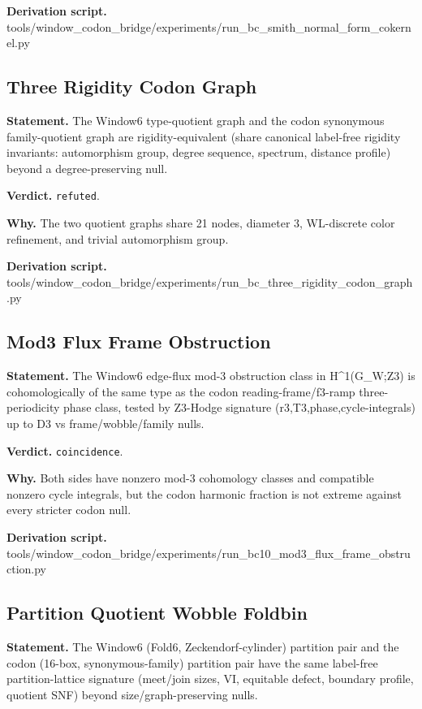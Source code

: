 \textbf{Derivation script.} tools/window\_codon\_bridge/experiments/run\_bc\_smith\_normal\_form\_cokernel.py

\subsection{Three Rigidity Codon Graph}\label{sec:bridge-three-rigidity-codon-graph}
\textbf{Statement.} The Window6 type-quotient graph and the codon synonymous family-quotient graph are
rigidity-equivalent (share canonical label-free rigidity invariants: automorphism group, degree
sequence, spectrum, distance profile) beyond a degree-preserving null.

\textbf{Verdict.} \texttt{refuted}.

\textbf{Why.} The two quotient graphs share 21 nodes, diameter 3, WL-discrete color refinement, and trivial
automorphism group.

\textbf{Derivation script.} tools/window\_codon\_bridge/experiments/run\_bc\_three\_rigidity\_codon\_graph.py

\subsection{Mod3 Flux Frame Obstruction}\label{sec:bridge-mod3-flux-frame-obstruction}
\textbf{Statement.} The Window6 edge-flux mod-3 obstruction class in H\textasciicircum{}1(G\_W;Z3) is cohomologically of
the same type as the codon reading-frame/f3-ramp three-periodicity phase class, tested by Z3-Hodge
signature (r3,T3,phase,cycle-integrals) up to D3 vs frame/wobble/family nulls.

\textbf{Verdict.} \texttt{coincidence}.

\textbf{Why.} Both sides have nonzero mod-3 cohomology classes and compatible nonzero cycle integrals, but the
codon harmonic fraction is not extreme against every stricter codon null.

\textbf{Derivation script.} tools/window\_codon\_bridge/experiments/run\_bc10\_mod3\_flux\_frame\_obstruction.py

\subsection{Partition Quotient Wobble Foldbin}\label{sec:bridge-partition-quotient-wobble-foldbin}
\textbf{Statement.} The Window6 (Fold6, Zeckendorf-cylinder) partition pair and the codon (16-box, synonymous-family)
partition pair have the same label-free partition-lattice signature (meet/join sizes, VI, equitable
defect, boundary profile, quotient SNF) beyond size/graph-preserving nulls.

